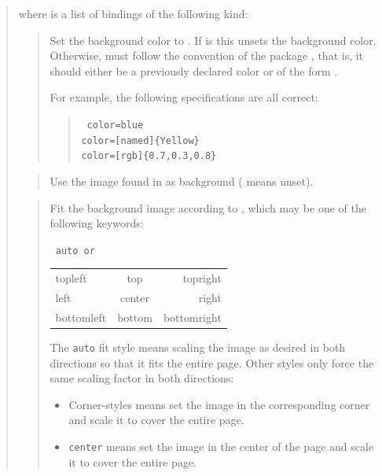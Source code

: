 \documentclass[12pt]{article}
\begin{document}
\medskip\noindent
\docdef \advibg \doctt {[global]}
\begin{quote}
where  is a list of bindings of the following kind:

\begin{quote}
Set the background color to .
If  is  this unsets the background color. 
Otherwise,  must follow the convention of the package 
, that is, it should either be a previously declared color or 
of the form . 

For example, the following specifications are all correct:
\begin{quote}\tt
color=blue\\
color=[named]\{Yellow\}\\
color=[rgb]\{0.7,0.3,0.8\}\\
\end{quote}
\end{quote}

\begin{quote}
Use the image found in  as background ( means unset).
\end{quote}

\begin{quote}
Fit the background image according to , which may be 
one of the following keywords:
\begin{center}
\tt
auto \hfill {\rm or} \hfill
\begin{tabular}{l@{\qquad}c@{\qquad}r}
topleft&   top& topright\\
left&  center&  right \\
bottomleft& bottom & bottomright\\
\end{tabular}
\end{center}
The {\tt auto} fit style means scaling the image as desired in both directions
so that it fits the entire page. Other styles only force the same scaling
factor in both directions:
\begin {itemize}

\item Corner-styles means set the image in the corresponding corner
and scale it to cover the entire page.

\item {\tt center} means set the image in the center of the page and
scale it to cover the entire page.


\end{itemize}
\end{quote}
\end{quote}
\end{document}
